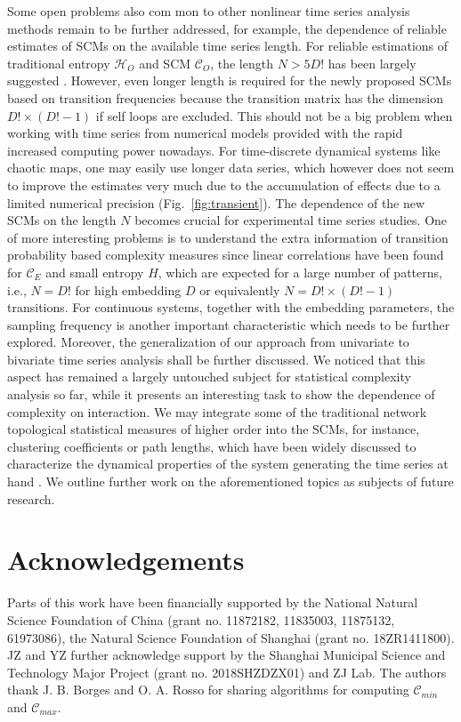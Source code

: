 \documentclass[aip,cha,reprint,nofootinbib]{revtex4-1}
\begin{document}
Some open problems also com	mon to other nonlinear time series analysis methods remain to be further addressed, for example, the dependence of reliable estimates of SCMs on the available time series length. {\color{red}For reliable estimations of traditional entropy $\mathcal{H}_O$ and SCM $\mathcal{C}_O$, the length $N > 5 D!$ has been largely suggested \cite{BandtPRL2002,AmigoPTRSA2014}. However, even longer length is required for the newly proposed SCMs based on transition frequencies because the transition matrix has the dimension $D!\times (D! - 1)$ if self loops are excluded. This should not be a big problem when working with time series from numerical models provided with the rapid increased computing power nowadays. } For time-discrete dynamical systems like chaotic maps, one may easily use longer data series, which however does not seem to improve the estimates very much due to the accumulation of effects due to a limited numerical precision (Fig.~\ref{fig:transient}). {\color{red} The dependence of the new SCMs on the length $N$ becomes crucial for experimental time series studies. One of more interesting problems is to understand the extra information of transition probability based complexity measures since linear correlations have been found for $\mathcal{C}_{E}$ and small entropy $H$, which are expected for a large number of patterns, i.e., $N = D!$ for high embedding $D$ or equivalently $N = D! \times (D!-1)$ transitions. } For continuous systems, together with the embedding parameters, the sampling frequency is another important characteristic which needs to be further explored. Moreover, the generalization of our approach from univariate to bivariate time series analysis shall be further discussed. We noticed that this aspect has remained a largely untouched subject for statistical complexity analysis so far, while it presents an interesting task to show the dependence of complexity on interaction. {\color{red} We may integrate some of the traditional network topological statistical measures of higher order into the SCMs, for instance, clustering coefficients or path lengths, which have been widely discussed to characterize the dynamical properties of the system generating the time series at hand \cite{ZouPR2018}.} We outline further work on the aforementioned topics as subjects of future research. 

\section*{Acknowledgements}
Parts of this work have been financially supported by the National Natural Science Foundation of China (grant no. 11872182, 11835003, 11875132, 61973086), the Natural Science Foundation of Shanghai (grant no. 18ZR1411800). JZ and YZ further acknowledge support by the Shanghai Municipal Science and Technology Major Project (grant no. 2018SHZDZX01) and ZJ Lab. The authors thank J. B. Borges and O. A. Rosso for sharing algorithms for computing $\mathcal{C}_{min}$ and $\mathcal{C}_{max}$. 
\end{document}
